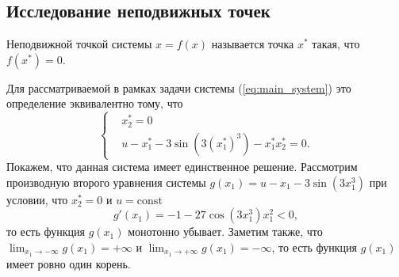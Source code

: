\subsection{Исследование неподвижных точек}
\begin{definition}
        Неподвижной точкой системы $x = f(x)$ называется точка $x^*$ такая, что $f(x^*) = 0$.
\end{definition}
Для рассматриваемой в рамках задачи системы (\ref{eq:main_system}) это определение эквивалентно тому, что
$$
        \left\{
        \begin{aligned}
                & x_2^* = 0 \\
                & u - x_1^* - 3 \sin(3(x_1^*)^3) - x_1^* x_2^* = 0.
        \end{aligned}
        \right.
$$
Покажем, что данная система имеет единственное решение. Рассмотрим производную второго уравнения системы $g(x_1) = u - x_1 -  3 \sin(3x_1^3)$ при условии, что $x_2^* = 0$ и $u = \mbox{const}$
$$
        g'(x_1) = - 1 - 27\cos(3x_1^3)x_1^2 < 0,
$$
то есть функция $g(x_1)$ монотонно убывает. Заметим также, что $\lim_{x_1\to-\infty}g(x_1) = +\infty$ и $\lim_{x_1\to+\infty}g(x_1) = -\infty$, то есть функция $g(x_1)$ имеет ровно один корень.

